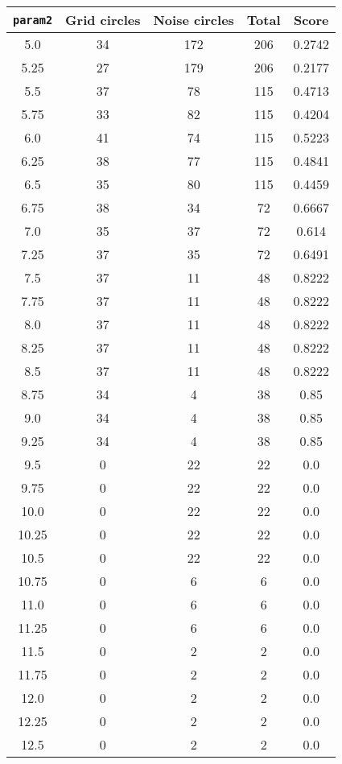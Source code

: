 \documentclass[letterpaper, 12pt]{article}
\begin{document}
\begin{longtable}{|c|c|c|c|c|}
\hline
\textbf{\texttt{param2}} & \textbf{Grid circles} & \textbf{Noise circles} & \textbf{Total} & \textbf{Score} \\
\hline
5.0 & 34 & 172 & 206 & 0.2742 \\
\hline
5.25 & 27 & 179 & 206 & 0.2177 \\
\hline
5.5 & 37 & 78 & 115 & 0.4713 \\
\hline
5.75 & 33 & 82 & 115 & 0.4204 \\
\hline
6.0 & 41 & 74 & 115 & 0.5223 \\
\hline
6.25 & 38 & 77 & 115 & 0.4841 \\
\hline
6.5 & 35 & 80 & 115 & 0.4459 \\
\hline
6.75 & 38 & 34 & 72 & 0.6667 \\
\hline
7.0 & 35 & 37 & 72 & 0.614 \\
\hline
7.25 & 37 & 35 & 72 & 0.6491 \\
\hline
7.5 & 37 & 11 & 48 & 0.8222 \\
\hline
7.75 & 37 & 11 & 48 & 0.8222 \\
\hline
8.0 & 37 & 11 & 48 & 0.8222 \\
\hline
8.25 & 37 & 11 & 48 & 0.8222 \\
\hline
8.5 & 37 & 11 & 48 & 0.8222 \\
\hline
8.75 & 34 & 4 & 38 & 0.85 \\
\hline
9.0 & 34 & 4 & 38 & 0.85 \\
\hline
9.25 & 34 & 4 & 38 & 0.85 \\
\hline
9.5 & 0 & 22 & 22 & 0.0 \\
\hline
9.75 & 0 & 22 & 22 & 0.0 \\
\hline
10.0 & 0 & 22 & 22 & 0.0 \\
\hline
10.25 & 0 & 22 & 22 & 0.0 \\
\hline
10.5 & 0 & 22 & 22 & 0.0 \\
\hline
10.75 & 0 & 6 & 6 & 0.0 \\
\hline
11.0 & 0 & 6 & 6 & 0.0 \\
\hline
11.25 & 0 & 6 & 6 & 0.0 \\
\hline
11.5 & 0 & 2 & 2 & 0.0 \\
\hline
11.75 & 0 & 2 & 2 & 0.0 \\
\hline
12.0 & 0 & 2 & 2 & 0.0 \\
\hline
12.25 & 0 & 2 & 2 & 0.0 \\
\hline
12.5 & 0 & 2 & 2 & 0.0 \\

\end{longtable}
\end{document}
